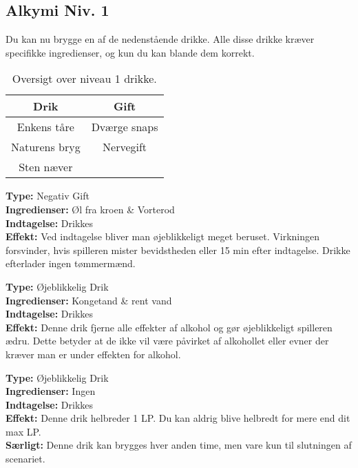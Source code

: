 \subsection{Alkymi Niv. 1}
Du kan nu brygge en af de nedenstående drikke. Alle disse drikke kræver specifikke ingredienser, og kun du kan blande dem korrekt.\\

\begin{table}[H]
    \centering
    \begin{tabular}{|c|c|}
        \rowcolor{cerulean!80}\hline
        Drik & Gift \\\hline
        Enkens tåre &  Dværge snaps \\\hline
        Naturens bryg & Nervegift \\\hline
        Sten næver &  \\\hline
    \end{tabular}
    \caption{Oversigt over niveau 1 drikke.}
\end{table}

\begin{gift*}
\textbf{Type:} Negativ Gift\\
\textbf{Ingredienser:} Øl fra kroen \& Vorterod\\
\textbf{Indtagelse:} Drikkes\\
\textbf{Effekt:} Ved indtagelse bliver man øjeblikkeligt meget beruset. Virkningen forsvinder, hvis spilleren mister bevidstheden eller 15 min efter indtagelse. Drikke efterlader ingen tømmermænd.\\
\end{gift*}

\begin{drik*}
\textbf{Type:} Øjeblikkelig Drik\\
\textbf{Ingredienser:} Kongetand \& rent vand\\
\textbf{Indtagelse:} Drikkes\\
\textbf{Effekt:} Denne drik fjerne alle effekter af alkohol og gør øjeblikkeligt spilleren ædru. Dette betyder at de ikke vil være påvirket af alkohollet eller evner der kræver man er under effekten for alkohol.\\
\end{drik*}

\begin{drik*}
    \textbf{Type:} Øjeblikkelig Drik\\
    \textbf{Ingredienser:} Ingen\\
    \textbf{Indtagelse:} Drikkes\\
    \textbf{Effekt:} Denne drik helbreder 1 LP. Du kan aldrig blive helbredt for mere end dit max LP.\\
    \textbf{Særligt:} Denne drik kan brygges hver anden time, men vare kun til slutningen af scenariet.
\end{drik*}

